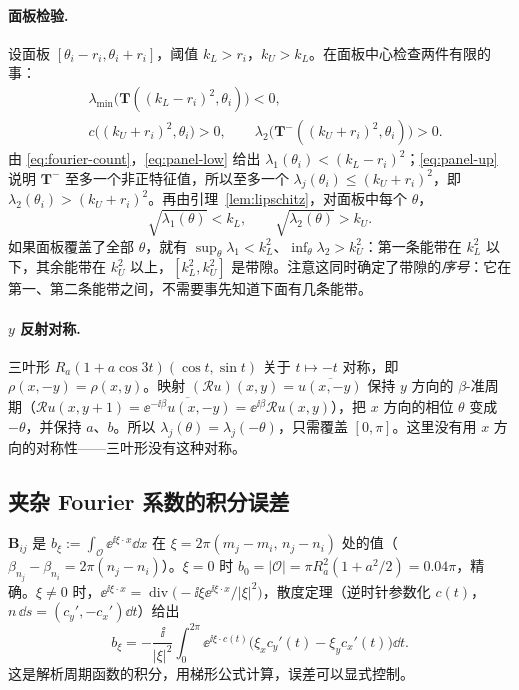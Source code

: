 \documentclass[11pt,a4paper,fontset=fandol]{ctexart}
\begin{document}
\paragraph{面板检验.} 设面板 $[\theta_i-r_i,\theta_i+r_i]$，阈值 $k_L>r_i$，$k_U>k_L$。在面板中心检查两件有限的事：
\begin{align}
&\lambda_{\min}\bigl(\bm T((k_L-r_i)^2,\theta_i)\bigr)<0, \label{eq:panel-low}\\
&c\bigl((k_U+r_i)^2,\theta_i\bigr)>0,\qquad \lambda_2\bigl(\bm T^-((k_U+r_i)^2,\theta_i)\bigr)>0 . \label{eq:panel-up}
\end{align}
由 \eqref{eq:fourier-count}，\eqref{eq:panel-low} 给出 $\lambda_1(\theta_i)<(k_L-r_i)^2$；\eqref{eq:panel-up} 说明 $\bm T^-$ 至多一个非正特征值，所以至多一个 $\lambda_j(\theta_i)\le(k_U+r_i)^2$，即 $\lambda_2(\theta_i)>(k_U+r_i)^2$。再由引理~\ref{lem:lipschitz}，对面板中每个 $\theta$，
\[
\sqrt{\lambda_1(\theta)}<k_L,\qquad \sqrt{\lambda_2(\theta)}>k_U .
\]
如果面板覆盖了全部 $\theta$，就有 $\sup_\theta\lambda_1<k_L^2$、$\inf_\theta\lambda_2>k_U^2$：第一条能带在 $k_L^2$ 以下，其余能带在 $k_U^2$ 以上，$[k_L^2,k_U^2]$ 是带隙。注意这同时确定了带隙的\emph{序号}：它在第一、第二条能带之间，不需要事先知道下面有几条能带。

\paragraph{$y$ 反射对称.} 三叶形 $R_a(1+a\cos3t)(\cos t,\sin t)$ 关于 $t\mapsto-t$ 对称，即 $\rho(x,-y)=\rho(x,y)$。映射 $(\mathcal Ru)(x,y)=\overline{u(x,-y)}$ 保持 $y$ 方向的 $\beta$-准周期（$\mathcal Ru(x,y+1)=\overline{\ee^{-\ii\beta}u(x,-y)}=\ee^{\ii\beta}\mathcal Ru(x,y)$），把 $x$ 方向的相位 $\theta$ 变成 $-\theta$，并保持 $a$、$b$。所以 $\lambda_j(\theta)=\lambda_j(-\theta)$，只需覆盖 $[0,\pi]$。这里没有用 $x$ 方向的对称性——三叶形没有这种对称。

\subsection{夹杂 Fourier 系数的积分误差}

$\bm B_{ij}$ 是 $b_\xi:=\int_{\mathcal O}\ee^{\ii\xi\cdot x}\dd x$ 在 $\xi=2\pi(m_j-m_i,\,n_j-n_i)$ 处的值（$\beta_{n_j}-\beta_{n_i}=2\pi(n_j-n_i)$）。$\xi=0$ 时 $b_0=|\mathcal O|=\pi R_a^2(1+a^2/2)=0.04\pi$，精确。$\xi\ne0$ 时，$\ee^{\ii\xi\cdot x}=\operatorname{div}\bigl(-\ii\xi\ee^{\ii\xi\cdot x}/|\xi|^2\bigr)$，散度定理（逆时针参数化 $c(t)$，$n\,\dd s=(c_y',-c_x')\dd t$）给出
\begin{equation}
\label{eq:bxi}
b_\xi=-\frac{\ii}{|\xi|^2}\int_0^{2\pi}\ee^{\ii\xi\cdot c(t)}\bigl(\xi_xc_y'(t)-\xi_yc_x'(t)\bigr)\dd t .
\end{equation}
这是解析周期函数的积分，用梯形公式计算，误差可以显式控制。
\end{document}
